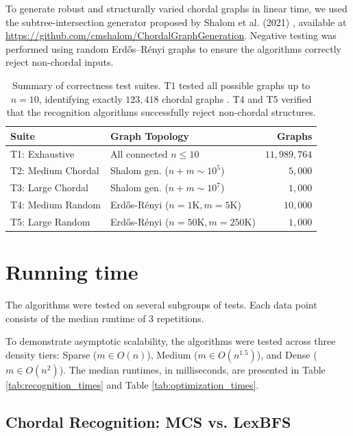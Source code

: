 To generate robust and structurally varied chordal graphs in linear time, we used the subtree-intersection generator proposed by Shalom et al. (2021) \cite{Shalom2019}, available at \url{https://github.com/cmshalom/ChordalGraphGeneration}. Negative testing was performed using random Erdős–Rényi graphs to ensure the algorithms correctly reject non-chordal inputs. 

\begin{table}[H]
\centering
\begin{tabular}{llr}
\toprule
\textbf{Suite} & \textbf{Graph Topology} & \textbf{Graphs} \\
\midrule
T1: Exhaustive   & All connected $n \le 10$ & $11,989,764$ \\
T2: Medium Chordal & Shalom gen. ($n+m \sim 10^5$) & $5,000$ \\
T3: Large Chordal& Shalom gen. ($n+m \sim 10^7$) & $1,000$ \\
T4: Medium Random & Erdős-Rényi ($n=1\text{K}, m=5\text{K}$) & $10,000$ \\
T5: Large Random  & Erdős-Rényi ($n=50\text{K}, m=250\text{K}$) & $1,000$ \\
\bottomrule
\end{tabular}
\caption{Summary of correctness test suites. T1 tested all possible graphs up to $n=10$, identifying exactly $123,418$ chordal graphs \cite{OEISA048192}. T4 and T5 verified that the recognition algorithms successfully reject non-chordal structures.}
\label{tab:test_suites}
\end{table}

\section{Running time}

The algorithms were tested on several subgroups of tests. Each data point consists of the median runtime of $3$ repetitions. 

To demonstrate asymptotic scalability, the algorithms were tested across three density tiers: Sparse ($m \in O(n)$), Medium ($m \in O(n^{1.5})$), and Dense ($m \in O(n^2)$). The median runtimes, in milliseconds, are presented in Table \ref{tab:recognition_times} and Table \ref{tab:optimization_times}.

\subsection{Chordal Recognition: MCS vs. LexBFS}

